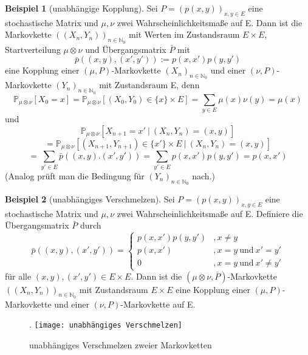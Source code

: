 \documentclass[a4paper,12pt]{scrartcl}
\theoremstyle{definition}
\newtheorem{bsp}{Beispiel}[section]
\begin{document}
\begin{bsp}[unabhängige Kopplung]
\label{BSP unabhängige Kopplung}
Sei $P = (p(x,y))_{x,y \in E}$ eine stochastische Matrix und $\mu, \nu$ zwei Wahrscheinlichkeitsmaße auf E. Dann ist die Markovkette  $((X_{n},Y_{n}))_{n \in \mathbb{N}_{0}}$ mit Werten im Zustandsraum $E \times E$, Startverteilung $\mu \otimes \nu$ und Übergangsmatrix $\bar{P}$ mit
\begin{equation*}
\bar{p} \left( (x,y),(x',y') \right) := p(x,x')p(y,y')
\end{equation*}
eine Kopplung einer $(\mu,P)$-Markovkette $(X_{n})_{n \in \mathbb{N}_{0}}$ und einer $(\nu,P)$-Markovkette $(Y_{n})_{n \in \mathbb{N}_{0}}$ mit Zustandsraum E, denn
\begin{equation*}
\mathbb{P}_{\mu \otimes \nu}[X_{0} =x] = \mathbb{P}_{\mu \otimes \nu}[(X_{0},Y_{0}) \in \lbrace x \rbrace \times E] = \sum_{y \in E} \mu(x) \nu(y) = \mu(x)
\end{equation*}
und
\begin{equation*}
\mathbb{P}_{\mu \otimes \nu}[X_{n+1}=x' \: | \: (X_{n},Y_{n}) = (x,y)]
\end{equation*}
\begin{equation*}
= \mathbb{P}_{\mu \otimes \nu}[(X_{n+1},Y_{n+1}) \in \lbrace x' \rbrace \times E \: | \: (X_{n},Y_{n}) = (x,y)]
\end{equation*}
\begin{equation*}
= \sum_{y' \in E} \bar{p} \left( (x,y).(x',y') \right) = \sum_{y' \in E} p(x,x')p(y,y') = p(x,x')
\end{equation*}
(Analog prüft man die Bedingung für $(Y_{n})_{n \in \mathbb{N}_{0}}$ nach.)
\end{bsp}
\begin{bsp}[unabhängiges Verschmelzen]
Sei $P = (p(x,y))_{x,y \in E}$ eine stochastische Matrix und $\mu,\nu$ zwei Wahrscheinlichkeitsmaße auf E. Definiere die Übergangsmatrix $\bar{P}$ durch
\begin{equation*}
\bar{p}((x,y),(x',y'))=
\begin{cases}
p(x,x')p(y,y') & , x \neq y\\
p(x,x') & , x = y \: \mathrm{und} \: x' = y'\\
0 & , x=y \: \mathrm{und} \: x' \neq y'
\end{cases}
\end{equation*}
für alle $(x,y),(x',y') \in E \times E$. Dann ist die $(\mu \otimes \nu,\bar{P})$-Markovkette  $((X_{n},Y_{n}))_{n \in \mathbb{N}_{0}}$ mit Zustandsraum $E \times E$ eine Kopplung einer $(\mu,P)$-Markovkette und einer $(\nu,P)$-Markovkette auf E.
\begin{figure}[H].
\centering
\texttt{[image: unabhängiges Verschmelzen]}
\caption{unabhängiges Verschmelzen zweier Markovketten}
\end{figure}
\noindent
\end{bsp}
\end{document}
